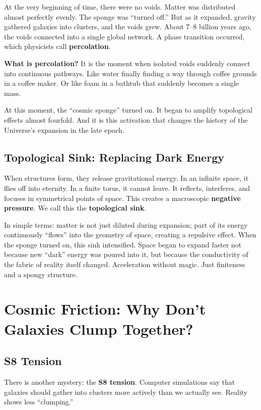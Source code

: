 \documentclass[12pt,a4paper,oneside]{book}
\begin{document}
At the very beginning of time, there were no voids. Matter was distributed almost perfectly evenly. The sponge was “turned off.” But as it expanded, gravity gathered galaxies into clusters, and the voids grew. About 7–8 billion years ago, the voids connected into a single global network. A phase transition occurred, which physicists call \textbf{percolation}.

\textbf{What is percolation?} It is the moment when isolated voids suddenly connect into continuous pathways. Like water finally finding a way through coffee grounds in a coffee maker. Or like foam in a bathtub that suddenly becomes a single mass.

At this moment, the “cosmic sponge” turned on. It began to amplify topological effects almost fourfold. And it is this activation that changes the history of the Universe's expansion in the late epoch.

\section{Topological Sink: Replacing Dark Energy}

When structures form, they release gravitational energy. In an infinite space, it flies off into eternity. In a finite torus, it cannot leave. It reflects, interferes, and focuses in symmetrical points of space. This creates a macroscopic \textbf{negative pressure}. We call this the \textbf{topological sink}.

In simple terms: matter is not just diluted during expansion; part of its energy continuously “flows” into the geometry of space, creating a repulsive effect. When the sponge turned on, this sink intensified. Space began to expand faster not because new “dark” energy was poured into it, but because the conductivity of the fabric of reality itself changed. Acceleration without magic. Just finiteness and a spongy structure.

\chapter{Cosmic Friction: Why Don't Galaxies Clump Together?}

\section{S8 Tension}

There is another mystery: the \textbf{S8 tension}. Computer simulations say that galaxies should gather into clusters more actively than we actually see. Reality shows less “clumping.”
\end{document}
